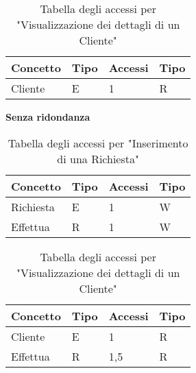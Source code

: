 \documentclass{article}
\begin{document}
\begin{table}[h]
    \centering
    \begin{adjustbox}{width=0.6\textwidth}
        \begin{tabular}{|m{2cm}|m{2cm}|m{2cm}|m{2cm}|}
            \hline  
            \textbf{Concetto} & \textbf{Tipo} & \textbf{Accessi} & \textbf{Tipo}\\ 
            \hline
            Cliente & E & 1 & R\\
            \hline
        \end{tabular}
    \end{adjustbox}
    \caption{Tabella degli accessi per "Visualizzazione dei dettagli di un Cliente"}
    \label{tab:accesstable}
\end{table}

\textbf{Senza ridondanza}

\begin{table}[h]
    \centering
    \begin{adjustbox}{width=0.6\textwidth}
        \begin{tabular}{|m{2cm}|m{2cm}|m{2cm}|m{2cm}|}
            \hline  
            \textbf{Concetto} & \textbf{Tipo} & \textbf{Accessi} & \textbf{Tipo}\\ 
            \hline
            Richiesta & E & 1 & W\\
            \hline
            Effettua & R & 1 & W\\
            \hline
        \end{tabular}
    \end{adjustbox}
    \caption{Tabella degli accessi per "Inserimento di una Richiesta" }
    \label{tab:accesstable}
\end{table}

\begin{table}[h!]
    \centering
    \begin{adjustbox}{width=0.6\textwidth}
        \begin{tabular}{|m{2cm}|m{2cm}|m{2cm}|m{2cm}|}
            \hline  
            \textbf{Concetto} & \textbf{Tipo} & \textbf{Accessi} & \textbf{Tipo}\\ 
            \hline
            Cliente & E & 1 & R\\
            \hline
            Effettua & R & 1,5 & R\\
            \hline
        \end{tabular}
    \end{adjustbox}
    \caption{Tabella degli accessi per "Visualizzazione dei dettagli di un Cliente"}
    \label{tab:accesstable}
\end{table}
\end{document}
